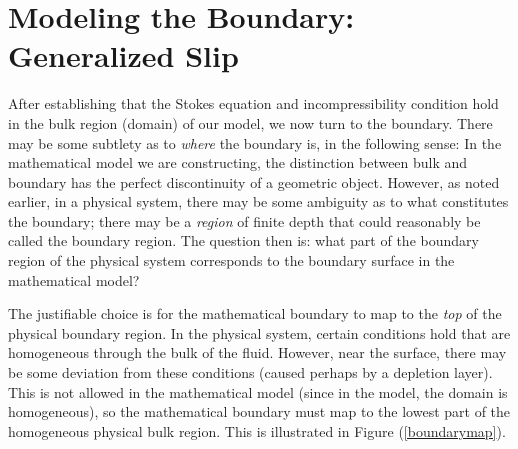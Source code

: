 \documentclass[12pt, a4paper, twoside, openright]{book}
\begin{document}
\section{Modeling the Boundary: Generalized Slip}




After establishing that the Stokes equation and incompressibility condition hold in the bulk region (domain) of our model, we now turn to the boundary.  There may be some subtlety as to \emph{where} the boundary is, in the following sense: In the mathematical model we are constructing, the distinction between bulk and boundary has the perfect discontinuity of a geometric object.  However, as noted earlier, in a physical system, there may be some ambiguity as to what constitutes the boundary; there may be a \emph{region} of finite depth that could reasonably be called the boundary region.  The question then is: what part of the boundary region of the physical system corresponds to the boundary surface in the mathematical model?

The justifiable choice is for the mathematical boundary to map to the \emph{top} of the physical boundary region.  In the physical system, certain conditions hold that are homogeneous through the bulk of the fluid.  However, near the surface, there may be some deviation from these conditions (caused perhaps by a depletion layer).  This is not allowed in the mathematical model (since in the model, the domain is homogeneous), so the mathematical boundary must map to the lowest part of the homogeneous physical bulk region.  This is illustrated in Figure (\ref{boundarymap}).
\end{document}
